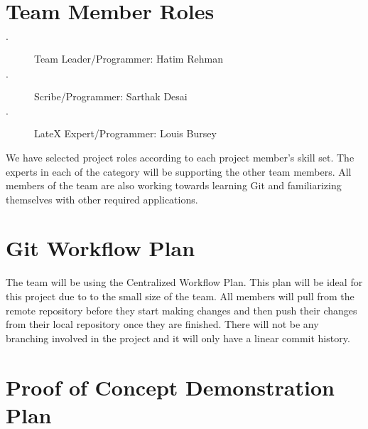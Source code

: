 \documentclass{article}
\begin{document}
\section{Team Member Roles} %

\begin {description}
  \item[$\cdot$] Team Leader/Programmer: Hatim Rehman
  \item[$\cdot$] Scribe/Programmer: Sarthak Desai
  \item[$\cdot$] LateX Expert/Programmer: Louis Bursey
\end {description}

We have selected project roles according to each project member's skill set. The experts in each of the category will be supporting the other team members. All members of the team are also working towards learning Git and familiarizing themselves with other required applications.

\section{Git Workflow Plan}
The team will be using the Centralized Workflow Plan. This plan will be ideal for this project due to to the small size of the team. All members will pull from the remote repository before they start making changes and then push their changes from their local repository once they are finished. There will not be any branching involved in the project and it will only have a linear commit history.

\section{Proof of Concept Demonstration Plan} %
\end{document}
